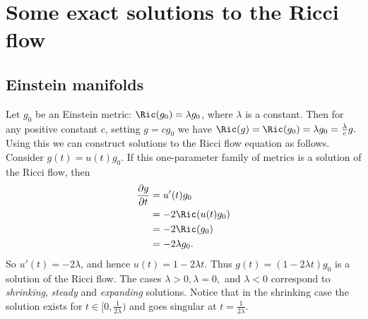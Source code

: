 \section{Some exact solutions to the Ricci flow}

\subsection{Einstein manifolds}
Let $g_0$ be an Einstein metric: $\Ric(g_0) = \lambda g_0$, where $\lambda$ is a constant. Then for
any positive constant $c$, setting $g = cg_0$ we have $\Ric(g)
= \Ric(g_0) = \lambda g_0= \frac{\lambda}{c} g.$ Using this we
can construct solutions to the Ricci flow equation as follows.
Consider $g(t) = u(t)g_{0}$. If this one-parameter family of
metrics is a solution of the Ricci flow, then
\begin{align*}
\frac{\partial g}{\partial t}& =u'(t)g_{0}\\& = -2\Ric(u(t)g_{0})\\&
= -2\Ric(g_{0})\\& = -2\lambda g_{0}.
\end{align*}
So $u'(t)= -2\lambda$,  and hence $u(t) = 1-2 \lambda t$. Thus
$g(t)= (1-2 \lambda t)g_{0}$ is a solution of the Ricci flow. The
cases $\lambda
>0, \lambda=0,$ and $\lambda< 0$ correspond to \textit{shrinking}, \textit{steady}
and \textit{expanding} solutions. Notice that in the shrinking case the
solution exists for $t\in [0,\frac{1}{2\lambda})$ and goes singular at
$t=\frac{1}{2\lambda}$.

